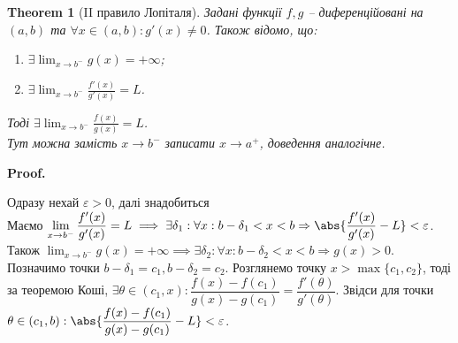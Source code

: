\documentclass[a4paper, 14pt]{article}
\makeatletter
\def\qed{$\blacksquare$}
\theoremstyle{theoremdd}
\newtheorem{theorem}{Theorem}[subsection]
\theoremstyle{theoremdd}
\theoremstyle{theoremdd}
\theoremstyle{theoremdd}
\theoremstyle{theoremdd}
\theoremstyle{theoremdd}
\theoremstyle{theoremdd}
\theoremstyle{theoremdd}
\renewenvironment{proof}[1][Proof.\\]{\par
\pushQED{\hfill \qed}%
\normalfont \topsep6\p@\@plus6\p@\relax
\trivlist
\item\relax
{\bfseries
#1\@addpunct{.}}\hspace\labelsep\ignorespaces
}{%
\popQED\endtrivlist\@endpefalse
}
\makeatother
\begin{document}
\begin{theorem}[II правило Лопіталя]
Задані функції $f,g$ -- диференційовані на $(a,b)$ та $\forall x \in (a,b): g'(x) \neq 0$. Також відомо, що:
\begin{enumerate}[nosep,wide=0pt,label={\arabic*)}]
\item $\exists \displaystyle \lim_{x \to b^-} g(x) = +\infty$;
\item $\exists \displaystyle \lim_{x \to b^-} \frac{f'(x)}{g'(x)} = L$.
\end{enumerate}
Тоді $\exists \displaystyle \lim_{x \to b^-} \frac{f(x)}{g(x)} = L$.\\
\textit{Тут можна замість $x \to b^-$ записати $x \to a^+$, доведення аналогічне.}
\end{theorem}

\begin{proof}
Одразу нехай $\varepsilon > 0$, далі знадобиться\\
Маємо $\displaystyle\lim_{x \to b^-} \dfrac{f'(x)}{g'(x)} = L \implies \exists \delta_1: \forall x: b-\delta_1 < x < b \Rightarrow \abs{\dfrac{f'(x)}{g'(x)}-L}<\varepsilon$.\\
Також $\displaystyle\lim_{x \to b^-} g(x) = +\infty \implies \exists \delta_2: \forall x: b-\delta_2 < x < b \Rightarrow g(x) > 0$.\\
Позначимо точки $b-\delta_1 = c_1, b-\delta_2 = c_2$. Розглянемо точку $x > \max \{c_1,c_2\}$, тоді за теоремою Коші, $\exists \theta \in (c_1,x): \dfrac{f(x)-f(c_1)}{g(x)-g(c_1)} = \dfrac{f'(\theta)}{g'(\theta)}$. Звідси для точки $\theta \in (c_1,b): \abs{\dfrac{f(x)-f(c_1)}{g(x)-g(c_1)} -L } < \varepsilon$.\\


\end{proof}
\end{document}
